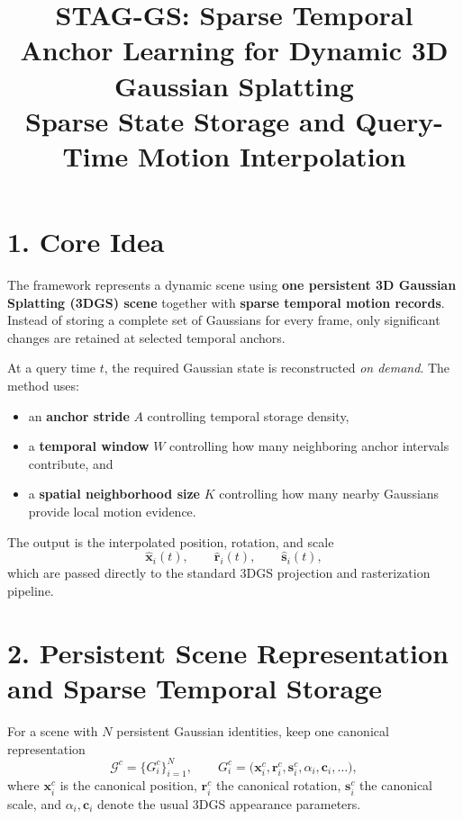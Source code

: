 \documentclass[10pt]{article}
\title{\vspace{-1.0em}\textbf{STAG-GS:
Sparse Temporal Anchor Learning for Dynamic 3D Gaussian Splatting}\\
\large Sparse State Storage and Query-Time Motion Interpolation}
\author{}
\date{}
\newcommand{\Gc}{\mathcal{G}^{c}}
\begin{document}
\maketitle
\vspace{-1.2em}

\section*{1. Core Idea}

The framework represents a dynamic scene using \textbf{one persistent 3D Gaussian Splatting (3DGS) scene} together with \textbf{sparse temporal motion records}. Instead of storing a complete set of Gaussians for every frame, only significant changes are retained at selected temporal anchors.

At a query time $t$, the required Gaussian state is reconstructed \emph{on demand}. The method uses:
\begin{itemize}
    \item an \textbf{anchor stride} $A$ controlling temporal storage density,
    \item a \textbf{temporal window} $W$ controlling how many neighboring anchor intervals contribute, and
    \item a \textbf{spatial neighborhood size} $K$ controlling how many nearby Gaussians provide local motion evidence.
\end{itemize}

The output is the interpolated position, rotation, and scale
\[
\hat{\mathbf{x}}_i(t),\qquad \hat{\mathbf{r}}_i(t),\qquad \hat{\mathbf{s}}_i(t),
\]
which are passed directly to the standard 3DGS projection and rasterization pipeline.

\section*{2. Persistent Scene Representation and Sparse Temporal Storage}

For a scene with $N$ persistent Gaussian identities, keep one canonical representation
\[
\Gc = \{G_i^c\}_{i=1}^{N},
\qquad
G_i^c = \bigl(\mathbf{x}_i^c,\mathbf{r}_i^c,\mathbf{s}_i^c,\alpha_i,\mathbf{c}_i,\ldots\bigr),
\]
where $\mathbf{x}_i^c$ is the canonical position, $\mathbf{r}_i^c$ the canonical rotation, $\mathbf{s}_i^c$ the canonical scale, and $\alpha_i,\mathbf{c}_i$ denote the usual 3DGS appearance parameters.
\end{document}
